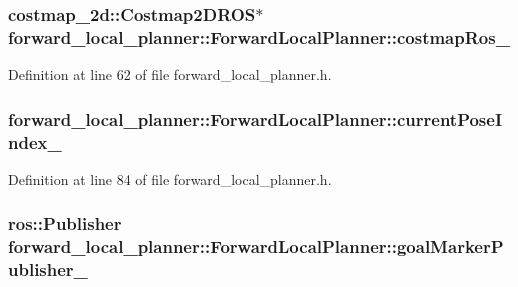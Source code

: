 \subsubsection[{\texorpdfstring{costmap\+Ros\+\_\+}{costmapRos_}}]{\setlength{\rightskip}{0pt plus 5cm}costmap\+\_\+2d\+::\+Costmap2\+D\+R\+OS$\ast$ forward\+\_\+local\+\_\+planner\+::\+Forward\+Local\+Planner\+::costmap\+Ros\+\_\+\hspace{0.3cm}{\ttfamily [private]}}\hypertarget{classforward__local__planner_1_1ForwardLocalPlanner_a2c232a05866edf1b71003188a03fc0c5}{}\label{classforward__local__planner_1_1ForwardLocalPlanner_a2c232a05866edf1b71003188a03fc0c5}


Definition at line 62 of file forward\+\_\+local\+\_\+planner.\+h.

\subsubsection[{\texorpdfstring{current\+Pose\+Index\+\_\+}{currentPoseIndex_}}]{ forward\+\_\+local\+\_\+planner\+::\+Forward\+Local\+Planner\+::current\+Pose\+Index\+\_\+\hspace{0.3cm}{\ttfamily [private]}}\hypertarget{classforward__local__planner_1_1ForwardLocalPlanner_a38a9662e8603f91d372759331b152077}{}\label{classforward__local__planner_1_1ForwardLocalPlanner_a38a9662e8603f91d372759331b152077}


Definition at line 84 of file forward\+\_\+local\+\_\+planner.\+h.

\subsubsection[{\texorpdfstring{goal\+Marker\+Publisher\+\_\+}{goalMarkerPublisher_}}]{\setlength{\rightskip}{0pt plus 5cm}ros\+::\+Publisher forward\+\_\+local\+\_\+planner\+::\+Forward\+Local\+Planner\+::goal\+Marker\+Publisher\+\_\+\hspace{0.3cm}{\ttfamily [private]}}\hypertarget{classforward__local__planner_1_1ForwardLocalPlanner_aa0248e082872c2e4f594269e5a785188}{}\label{classforward__local__planner_1_1ForwardLocalPlanner_aa0248e082872c2e4f594269e5a785188}


